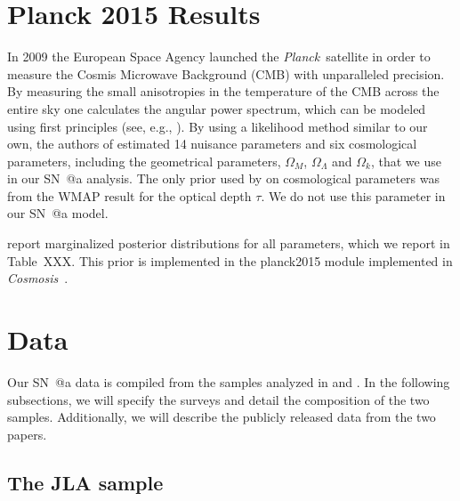 \documentclass[12pt,a4paper]{article}
\makeatletter
\newcommand\Planck{{\it Planck}\ }
\newcommand\Cosmosis{{\it Cosmosis}\ }
\newcommand*{\rom}[1]{\expandafter\@slowromancap\romannumeral #1@}
\newcommand{\sna}{\mbox{SN \rom{1}a}}
\makeatother
\begin{document}
\section{Planck 2015 Results}
\label{sec:planck}
In 2009 the European Space Agency launched the \Planck satellite in order
to measure the Cosmis Microwave Background (CMB) with unparalleled precision.
By measuring the small anisotropies in the temperature of the CMB across
the entire sky one calculates the angular power spectrum, which can be
modeled using first principles (see, e.g., \citet{dodelson2003}).
By using a likelihood method similar to our own, the authors of
\citet{planck2013} estimated 14 nuisance parameters and 
six cosmological parameters, including the geometrical parameters,
$\Omega_M$, $\Omega_\Lambda$ and $\Omega_k$, that we use in our
{\sna} analysis. The only prior used by \citet{planck2013}
on cosmological parameters was from the WMAP result \citep{wmap2011}
for the optical depth $\tau$. We do not use this parameter
in our {\sna} model.

\citet{planck2013} report marginalized
posterior distributions for all parameters,
which we report in Table~XXX. This prior is implemented
in the planck2015 module implemented in \Cosmosis \citep{cosmosis}.

\section{Data}
\label{sec:data}
Our {\sna} data is compiled from the samples analyzed in 
\citet{betoule2014} and \citet{rest2014}. In the following subsections, 
we will specify the surveys and detail the composition of the two samples. 
Additionally, we will describe the publicly released data from the two papers.

\subsection{The JLA sample}
\label{sec:betoule}
\end{document}

